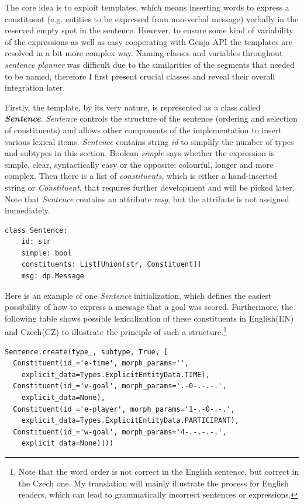 The core idea is to exploit templates, which means inserting words to express a constituent (e.g. entities to be expressed from non-verbal message) verbally in the reserved empty spot in the sentence. However, to ensure some kind of variability of the expressions as well as easy cooperating with Genja API the templates are resolved in a bit more complex way. Naming classes and variables throughout \textit{sentence planner} was difficult due to the similarities of the segments that needed to be named, therefore I first present crucial classes and reveal their overall integration later.

Firstly, the template, by its very nature, is represented as a class called \textit{\textbf{Sentence}}. \textit{Sentence} controls the structure of the sentence (ordering and selection of constituents) and allows other components of the implementation to insert various lexical items. \textit{Sentence} contains string \textit{id} to simplify the number of types and subtypes in this section. Boolean \textit{simple} says whether the expression is simple, clear, syntactically easy or the opposite: colourful, longer and more complex. Then there is a list of \textit{constituents}, which is either a hand-inserted string or \textit{Constituent}, that requires further development and will be picked later. Note that \textit{Sentence} contains an attribute \textit{msg}, but the attribute is not assigned immediately.

\begin{Verbatim}[frame=single]
class Sentence:
	id: str
	simple: bool
	constituents: List[Union[str, Constituent]]
	msg: dp.Message
\end{Verbatim}
\newpage 

Here is an example of one \textit{Sentence} initialization, which defines the easiest possibility of how to express a message that a goal was scored. Furthermore, the following table shows possible lexicalization of these constituents in English(EN) and Czech(CZ) to illustrate the principle of such a structure.\footnote{Note that the word order is not correct in the English sentence, but correct in the Czech one. My translation will mainly illustrate the process for English readers, which can lead to grammatically incorrect sentences or expressions.}

\begin{Verbatim}[frame=single]
Sentence.create(type_, subtype, True, [
  Constituent(id_='e-time', morph_params='',
  	explicit_data=Types.ExplicitEntityData.TIME),
  Constituent(id_='v-goal', morph_params='.-0-.-.-.',
  	explicit_data=None),
  Constituent(id_='e-player', morph_params='1-.-0-.-.',
  	explicit_data=Types.ExplicitEntityData.PARTICIPANT),
  Constituent(id_='w-goal', morph_params='4-.-.-.-.',
  	explicit_data=None)]))
\end{Verbatim}

